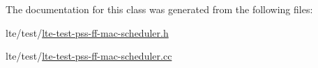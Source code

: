 The documentation for this class was generated from the following files\+:\begin{DoxyCompactItemize}
\item 
lte/test/\hyperlink{lte-test-pss-ff-mac-scheduler_8h}{lte-\/test-\/pss-\/ff-\/mac-\/scheduler.\+h}\item 
lte/test/\hyperlink{lte-test-pss-ff-mac-scheduler_8cc}{lte-\/test-\/pss-\/ff-\/mac-\/scheduler.\+cc}\end{DoxyCompactItemize}
